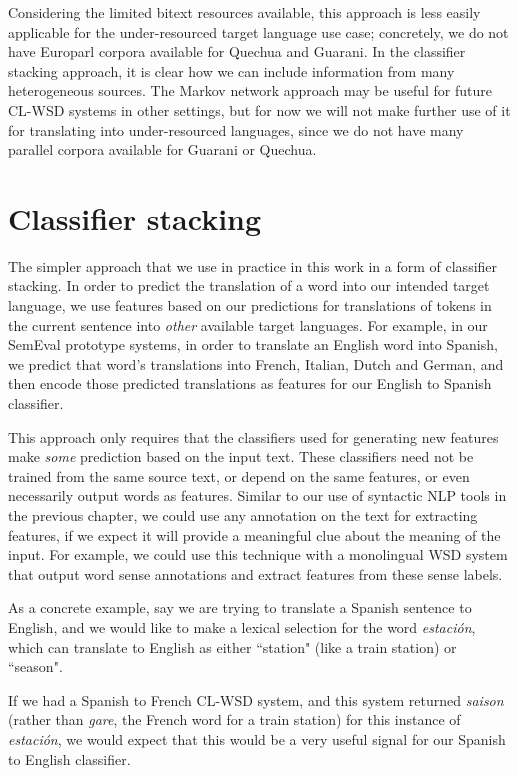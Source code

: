 Considering the limited bitext resources available, this approach is less
easily applicable for the under-resourced target language use case; concretely,
we do not have Europarl corpora available for Quechua and Guarani. In the
classifier stacking approach, it is clear how we can include information from
many heterogeneous sources. The Markov network approach may be useful for
future CL-WSD systems in other settings, but for now we will not make further
use of it for translating into under-resourced languages, since we do not have
many parallel corpora available for Guarani or Quechua.

\section{Classifier stacking}

The simpler approach that we use in practice in this work in a form of
classifier stacking. In order to predict the translation of a word into our
intended target language, we use features based on our predictions for
translations of tokens in the current sentence into \emph{other} available
target languages.
For example, in our SemEval prototype systems, in order to translate an
English word into Spanish, we predict that word's translations into French,
Italian, Dutch and German, and then encode those predicted translations as
features for our English to Spanish classifier.

This approach only requires that the classifiers used for generating new
features make \emph{some} prediction based on the input text. These classifiers 
need not be trained from the same source text, or depend on the same features,
or even necessarily output words as features. Similar to our use of syntactic
NLP tools in the previous chapter, we could use any annotation on the text for
extracting features, if we expect it will provide a meaningful clue about the
meaning of the input. For example, we could use this technique with a
monolingual WSD system that output word sense annotations and extract features
from these sense labels.

As a concrete example, say we are trying to translate a Spanish sentence to
English, and we would like to make a lexical selection for the word
\emph{estación}, which can translate to English as either ``station" (like a
train station) or ``season".

\label{sent:estacion}

If we had a Spanish to French CL-WSD system, and this system returned
\emph{saison} (rather than \emph{gare}, the French word for a train station)
for this instance of \emph{estación}, we would expect that this would be a very
useful signal for our Spanish to English classifier.

